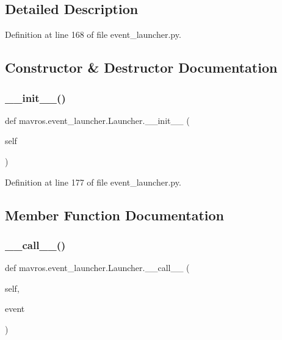 \subsection{Detailed Description}


Definition at line 168 of file event\+\_\+launcher.\+py.



\subsection{Constructor \& Destructor Documentation}
\mbox{\label{classmavros_1_1event__launcher_1_1Launcher_a192e461f63f91e535730ef6587ce0bf4}} 
\subsubsection{\texorpdfstring{\_\_init\_\_()}{\_\_init\_\_()}}
{\footnotesize\ttfamily def mavros.\+event\+\_\+launcher.\+Launcher.\+\_\+\+\_\+init\+\_\+\+\_\+ (\begin{DoxyParamCaption}\item[{}]{self }\end{DoxyParamCaption})}



Definition at line 177 of file event\+\_\+launcher.\+py.



\subsection{Member Function Documentation}
\mbox{\label{classmavros_1_1event__launcher_1_1Launcher_ac4c12ab46566145be88ab2d943606e61}} 
\subsubsection{\texorpdfstring{\_\_call\_\_()}{\_\_call\_\_()}}
{\footnotesize\ttfamily def mavros.\+event\+\_\+launcher.\+Launcher.\+\_\+\+\_\+call\+\_\+\+\_\+ (\begin{DoxyParamCaption}\item[{}]{self,  }\item[{}]{event }\end{DoxyParamCaption})}



